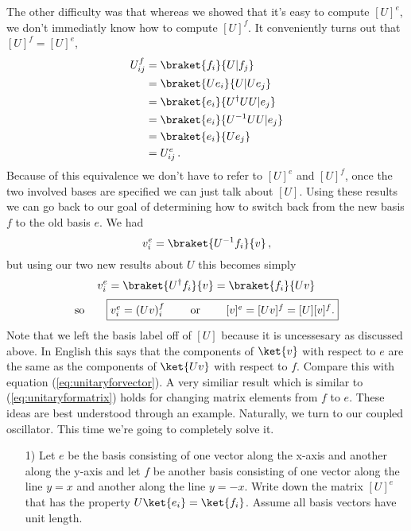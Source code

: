 The other difficulty was that whereas we showed that it's easy to compute $[U]^e$, we don't immediatly know how to compute $[U]^f$.
It conveniently turns out that $[U]^f = [U]^e$,
\begin{align*}
  U^f_{ij}
  &= \braket{f_i}{U|f_j} \\
  &= \braket{Ue_i}{U|Ue_j} \\
  &= \braket{e_i}{U^{\dag}UU|e_j} \\
  &= \braket{e_i}{U^{-1}UU|e_j} \\
  &= \braket{e_i}{Ue_j} \\
  &= U^e_{ij}
  \,.
\end{align*}
Because of this equivalence we don't have to refer to $[U]^e$ and $[U]^f$, once the two involved bases are specified we can just talk about $[U]$.
Using these results we can go back to our goal of determining how to switch back from the new basis $f$ to the old basis $e$.
We had
\begin{displaymath}
  v_i^e = \braket{U^{-1}f_i}{v} \, ,
\end{displaymath}
but using our two new results about $U$ this becomes simply
\begin{displaymath}
  v_i^e = \braket{U^{\dag}f_i}{v} = \braket{f_i}{Uv}
\end{displaymath}
\begin{displaymath}
  \textrm{so} \qquad  \framebox{$v_i^e = (Uv)_i^f$ \qquad or \qquad $[v]^e =[Uv]^f = [U][v]^f$.}
\end{displaymath}
Note that we left the basis label off of $[U]$ because it is uncessesary as discussed above.
In English this says that the components of $\ket{v}$ with respect to $e$ are the same as the components of $\ket{Uv}$ with respect to $f$.
Compare this with equation (\ref{eq:unitaryforvector}).
A very similiar result which is similar to (\ref{eq:unitaryformatrix}) holds for changing matrix elements from $f$ to $e$.
These ideas are best understood through an example.
Naturally, we turn to our coupled oscillator.
This time we're going to completely solve it.

\begin{enumerate}
  \item[1)] Let $e$ be the basis consisting of one vector along the x-axis and another along the y-axis and let $f$ be another basis consisting of one vector along the line $y = x$ and another along the line $y = -x$.
    Write down the matrix $[U]^e$ that has the property $U\ket{e_i}=\ket{f_i}$.
    Assume all basis vectors have unit length.
\end{enumerate}

